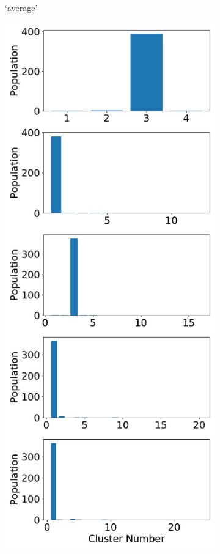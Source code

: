 \documentclass{article}
\begin{document}
\begin{figure}
\begin{subfigure}{0.24\textwidth}
  \caption{`average'}\label{fig:nclusters_average}
  \end{subfigure}
  \begin{subfigure}{0.24\textwidth}
  \includegraphics[width=\textwidth]{nclusters_single.pdf}

\end{subfigure}
\end{figure}
\end{document}
